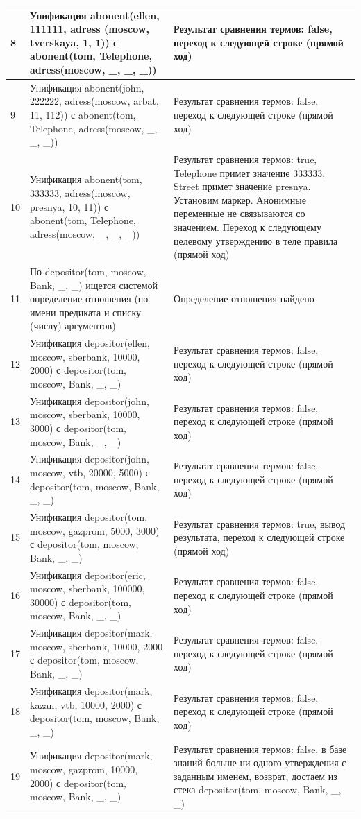 \documentclass[a4paper,14pt]{extreport} %
\begin{document}
\begin{longtable}{|p{1.1cm}|p{8.5cm}|p{7cm}|}
	8 & Унификация abonent(ellen, 111111, adress (moscow, tverskaya, 1, 1)) с abonent(tom, Telephone, adress(moscow, \_, \_, \_)) & Результат сравнения термов: false, переход к следующей строке (прямой ход) \\ \hline
	9 & Унификация abonent(john, 222222, adress(moscow, arbat, 11, 112)) с abonent(tom, Telephone, adress(moscow, \_, \_, \_)) & Результат сравнения термов: false, переход к следующей строке (прямой ход) \\ \hline
	10 & Унификация abonent(tom, 333333, adress(moscow, presnya, 10, 11)) с abonent(tom, Telephone, adress(moscow, \_, \_, \_)) & Результат сравнения термов: true, Telephone примет значение 333333, Street примет значение presnya. Установим маркер.  Анонимные переменные не связываются со значением. Переход к следующему целевому утверждению в теле правила (прямой ход) \\ \hline
	
	11 & По depositor(tom, moscow, Bank, \_, \_) ищется системой определение отношения (по имени предиката и списку (числу) аргументов) & Определение отношения найдено \\ \hline
	12 & Унификация depositor(ellen, moscow, sberbank, 10000, 2000) с depositor(tom, moscow, Bank, \_, \_)& Результат сравнения термов: false, переход к следующей строке (прямой ход) \\ \hline
	13 & Унификация depositor(john, moscow, sberbank, 10000, 3000) с depositor(tom, moscow, Bank, \_, \_) & Результат сравнения термов: false, переход к следующей строке (прямой ход) \\ \hline
	14 & Унификация depositor(john, moscow, vtb, 20000, 5000) с depositor(tom, moscow, Bank, \_, \_) & Результат сравнения термов: false, переход к следующей строке (прямой ход) \\ \hline
	15 & Унификация depositor(tom, moscow, gazprom, 5000, 3000) с depositor(tom, moscow, Bank, \_, \_) & Результат сравнения термов:  true, вывод результата, переход к следующей строке (прямой ход) \\ \hline
	16 & Унификация depositor(eric, moscow, sberbank, 100000, 30000) с depositor(tom, moscow, Bank, \_, \_) & Результат сравнения термов: false, переход к следующей строке (прямой ход) \\ \hline
	17 & Унификация depositor(mark, moscow, sberbank, 10000, 2000 с depositor(tom, moscow, Bank, \_, \_) & Результат сравнения термов: false, переход к следующей строке (прямой ход) \\ \hline
	18 & Унификация depositor(mark, kazan, vtb, 10000, 2000) с depositor(tom, moscow, Bank, \_, \_) & Результат сравнения термов:  false, переход к следующей строке (прямой ход) \\ \hline
	19 & Унификация depositor(mark, moscow, gazprom, 10000, 2000) с depositor(tom, moscow, Bank, \_, \_) &  Результат сравнения термов: false, в базе знаний больше ни одного утверждения с заданным именем, возврат, достаем из стека depositor(tom, moscow, Bank, \_, \_) \\ \hline
	

\end{longtable}
\end{document}
